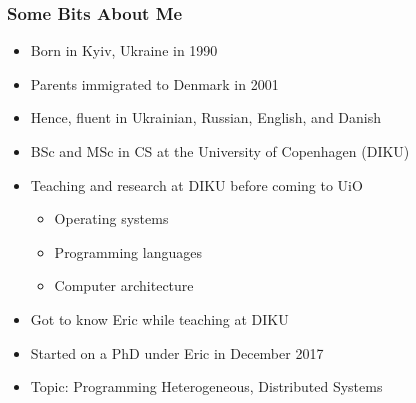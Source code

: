 \begin{frame}

\frametitle{Some Bits About Me}

\begin{itemize}

\item Born in Kyiv, Ukraine in 1990

\item Parents immigrated to Denmark in 2001

\item Hence, fluent in Ukrainian, Russian, English, and Danish

\item BSc and MSc in CS at the University of Copenhagen (DIKU)

\item Teaching and research at DIKU before coming to UiO

\begin{itemize}

\footnotesize

\item Operating systems

\item Programming languages

\item Computer architecture

\end{itemize}

\item Got to know Eric while teaching at DIKU

\item Started on a PhD under Eric in December 2017

\item Topic: Programming Heterogeneous, Distributed Systems

\end{itemize}

\end{frame}

